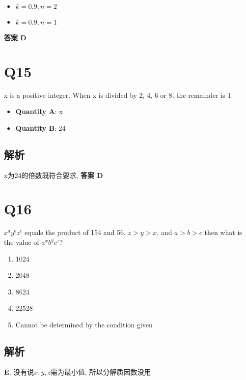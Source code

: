     \begin{itemize}
      \item $ k = 0.9, n = 2 $
      \item $ k = 0.9, n = 1 $
    \end{itemize}

    \textbf{答案 D}

\section{Q15}

  x is a positive integer. When x is divided by 2, 4, 6 or 8, the remainder
  is 1.

  \begin{itemize}
    \item \textbf{Quantity A}: x
    \item \textbf{Quantity B}: 24
  \end{itemize}

  \subsection{解析}

    x为24的倍数既符合要求, \textbf{答案 D}

\section{Q16}

  $ x^{a} y^{b} z^{c} $ equals the product of 154 and 56, $ z > y > x $,
  and $ a > b > c $ then what is the value of $ a^{x} b^{y} c^{z} $?

  \begin{enumerate}
    \item 1024
    \item 2048
    \item 8624
    \item 22528
    \item Cannot be determined by the condition given
  \end{enumerate}

  \subsection{解析}

    \textbf{E}, 没有说$ x,y, z $需为最小值, 所以分解质因数没用
